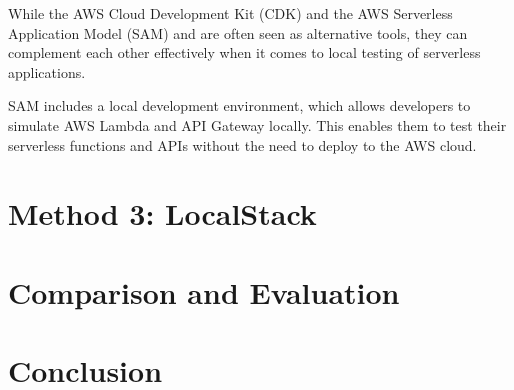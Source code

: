 \documentclass{article}
\begin{document}
While the AWS Cloud Development Kit (CDK) and the AWS Serverless Application Model (SAM) and  are often seen as alternative tools, they can complement each other effectively when it comes to local testing of serverless applications.

SAM includes a local development environment, which allows developers to simulate AWS Lambda and API Gateway locally. This enables them to test their serverless functions and APIs without the need to deploy to the AWS cloud.


\section{Method 3: LocalStack}

\section{Comparison and Evaluation}

\section{Conclusion}
\end{document}
